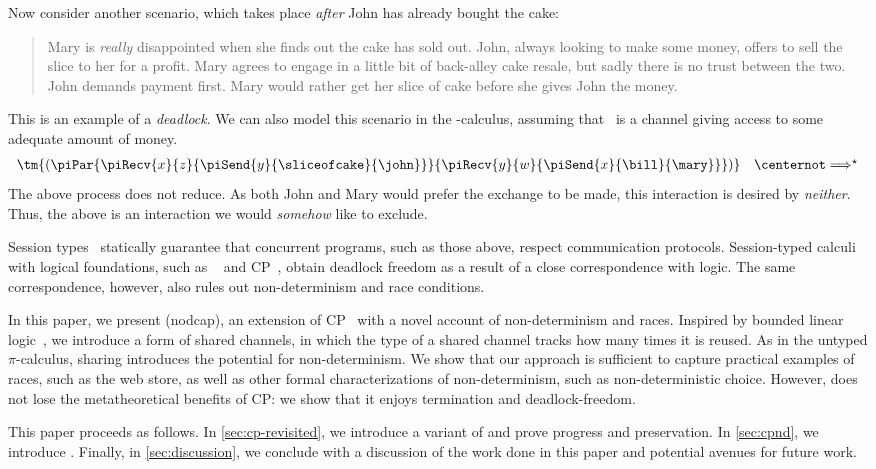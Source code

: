 \documentclass[UKenglish]{llncs}
\begin{document}
Now consider another scenario, which takes place \emph{after} John has already
bought the cake:
\begin{quote}
  Mary is \emph{really} disappointed when she finds out the cake has sold out.
  John, always looking to make some money, offers to sell the slice to her for a
  profit. Mary agrees to engage in a little bit of back-alley cake resale, but
  sadly there is no trust between the two.
  John demands payment first.
  Mary would rather get her slice of cake before she gives John the money.
\end{quote}
This is an example of a \emph{deadlock}. We can also model this scenario in the
\textpi-calculus, assuming that \bill\ is a channel giving access to some
adequate amount of money.
\[
  \begin{array}{c}
    \tm{(\piPar{%
    \piRecv{x}{z}{\piSend{y}{\sliceofcake}{\john}}
    }{%
    \piRecv{y}{w}{\piSend{x}{\bill}{\mary}}
    })}
    \quad
    \centernot\Longrightarrow^{\star}
  \end{array}  
\]
The above process does not reduce. As both John and Mary would prefer the
exchange to be made, this interaction is desired by \emph{neither}. Thus, the
above is an interaction we would \emph{somehow} like to exclude.

Session types~\cite{honda1993} statically guarantee that concurrent
programs, such as those above, respect communication protocols.
Session-typed calculi with logical foundations, such as
\piDILL~\cite{caires2010} and CP~\cite{wadler2012}, obtain deadlock freedom as a
result of a close correspondence with logic.
The same correspondence, however, also rules out non-determinism and race
conditions.

In this paper, we present \nodcap (nodcap), an extension of
CP~\cite{wadler2012} with a novel account of non-determinism and races.
Inspired by bounded linear logic~\cite{girard1992}, we introduce a form of
shared channels, in which the type of a shared channel tracks how many times it
is reused.
As in the untyped $\pi$-calculus, sharing introduces the potential for
non-determinism.
We show that our approach is sufficient to capture practical examples of races,
such as the web store, as well as other formal characterizations of
non-determinism, such as non-deterministic choice.  However, \nodcap does not
lose the metatheoretical benefits of CP: we show that it enjoys termination and
deadlock-freedom.

This paper proceeds as follows. In \cref{sec:cp-revisited}, we introduce a variant of \cp and prove progress and preservation. In \cref{sec:cpnd}, we introduce \nodcap. Finally, in \cref{sec:discussion}, we conclude with a discussion of the work
done in this paper and potential avenues for future work.
\end{document}
